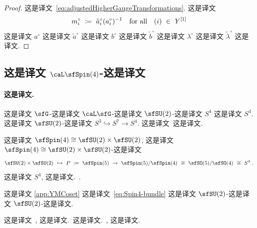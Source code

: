 \documentclass[
    affil-it, %
    auth-lg, %
    british, %
    compression, %
    contents, %
    custom-packages={}, %
    references={bigone}, %
]{lib/preprint}
\begin{document}
\begin{body}
\begin{proof}
 这是译文~\eqref{eq:adjustedHigherGaugeTransformations}. 这是译文 
            \begin{equation}
                m^\circ_i\ \coloneqq\ \tilde a^\circ_i(a^\circ_i)^{-1}
                {~~~\mbox{for all}~~~}
                (i)\ \in\ Y^{[1]}
            \end{equation}  这是译文 $a^\circ$ 这是译文 $\tilde a^\circ$ 这是译文 $b^\circ$ 这是译文 $\tilde b^\circ$ 这是译文 $\lambda^\circ$ 这是译文 $\tilde\lambda^\circ$ 这是译文.
        \end{proof}
        
        \subsection{这是译文 \texorpdfstring{$\caL\sfSpin(4)$}{LSpin(4)}-这是译文}\label{sec:Spin4Bundle}
        
        \paragraph{这是译文.} 这是译文 $\sfG$-这是译文 $\caL\sfG$-这是译文 $\sfSU(2)$-这是译文 $S^4$ 这是译文 $S^4$. 这是译文 $\sfSU(2)$-这是译文 $S^3\hookrightarrow S^7\rightarrow S^4$. 这是译文~这是译文. 
        
这是译文 $\sfSpin(4)\cong \sfSU(2)\times \sfSU(2)$, 这是译文 $\sfSpin(4)\cong \sfSU(2)\times \sfSU(2)$-这是译文 
        \begin{equation}\label{eq:Spin4-bundle}
            \sfSU(2)\times\sfSU(2)\ \hookrightarrow\ P\ \coloneqq\ \sfSpin(5)\ \rightarrow\ \sfSpin(5)/\sfSpin(4)\ \cong\ \sfSO(5)/\sfSO(4)\ \cong\ S^4~.
        \end{equation}  这是译文 $S^4$, 这是译文.~\cite{Dabrowski:1986en}.
        
 这是译文 \cref{app:YMCoset} 这是译文~\eqref{eq:Spin4-bundle} 这是译文 $\sfSU(2)$-这是译文 $\sfSU(2)$-这是译文.
        
 这是译文~\cite{Saemann:2017rjm}, 这是译文.~这是译文.~\cite{Fiorenza:2019usl}, 这是译文.
        
        

\end{body}
\end{document}
